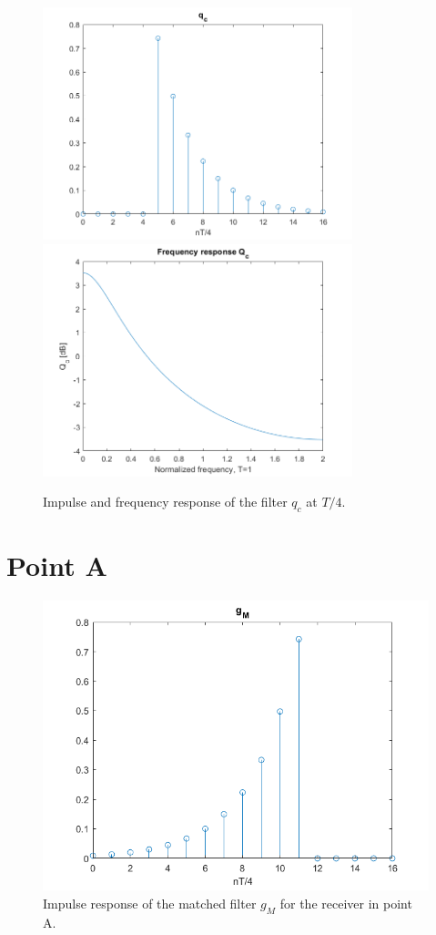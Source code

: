 \documentclass[a4paper,11.5pt]{article}
\begin{document}
\begin{figure}[ht]
	\begin{center}   
		\includegraphics[width=9cm]{figs/q_c.png} 
		\includegraphics[width=9cm]{figs/Qc.png} 
		\caption{Impulse and frequency response of the filter $q_c$ at $T/4$.}
		\label{fig:qc}
	\end{center}
\end{figure} 



\section*{Point A}


\begin{figure}[ht]
	\begin{center}   
		\includegraphics[width=\textwidth]{figs/A_gm.png} 
		\caption{Impulse response of the matched filter $g_{M}$ for the receiver in point A.}
		\label{fig:A_gm}
	\end{center}
\end{figure} 
\end{document}
